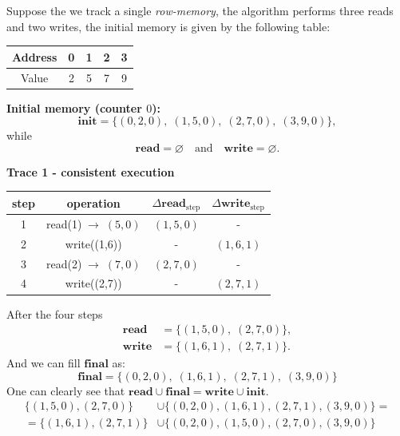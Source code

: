 \documentclass[../../book]{subfiles}
\begin{document}
\begin{example}
\noindent Suppose the we track a single \emph{row-memory}, the algorithm performs three reads and two writes, 
the initial memory is given by the following table:
\begin{center}
    \centering
    \begin{tabular}{|c|c|c|c|c|}
        \hline
        Address & 0 & 1 & 2 & 3 \\ \hline
        Value   & 2 & 5 & 7 & 9 \\ \hline
    \end{tabular}
\end{center}

\medskip
\noindent\textbf{Initial memory (counter $0$):}
\begin{equation*}
\mathbf{init} =\{(0,2,0), \; (1,5,0), \; (2,7,0), \; (3,9,0)\},
\end{equation*}
while 
\begin{equation*}
    \mathbf{read} = \varnothing \quad \text{and} \quad \mathbf{write} = \varnothing.
\end{equation*}

\medskip
\noindent\textbf{Trace 1 - consistent execution}
\begin{center}
    \begin{tabular}{c|c|c|c}
    \textbf{step} & \textbf{operation} & $\Delta\mathbf{read}_{\text{step}}$ & $\Delta\mathbf{write}_{\text{step}}$\\\hline
    1 & read(1)$  \; \to \; (5, 0)$ & $(1,5,0)$ & -        \\
    2 & write((1,6))                & -         & $(1,6,1)$\\
    3 & read(2)$  \; \to \; (7, 0)$ & $(2,7,0)$ & -        \\
    4 & write((2,7))                & -         & $(2,7,1)$\\
    \end{tabular}
\end{center}
After the four steps
\begin{equation*}
    \begin{aligned}
        \mathbf{read} &= \{(1,5,0), \; (2,7,0)\},\\
        \mathbf{write} &= \{(1,6,1), \; (2,7,1)\}.
    \end{aligned}
\end{equation*}
And we can fill $\mathbf{final}$ as:
\begin{equation*}
    \mathbf{final} = \{(0,2,0), \; (1,6,1), \; (2,7,1), \; (3,9,0)\}
\end{equation*}
One can clearly see that $\mathbf{read} \cup \mathbf{final} = \mathbf{write} \cup \mathbf{init}$.
\begin{align*}
    \{(1,5,0), (2,7,0)\} &\cup \{(0,2,0), (1,6,1), (2,7,1), (3,9,0)\} = \\
    = \{(1,6,1), (2,7,1)\} &\cup \{(0,2,0), (1,5,0), (2,7,0), (3,9,0)\}
\end{align*}


\end{example}
\end{document}
